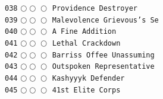 \documentclass[a4paper,landscape]{article}
\begin{document}
\begin{multicols*}{5}
\texttt{038} \(\bigcirc\!\bigcirc\!\bigcirc\)  \texttt{Providence Destroyer} \vspace{-0.3mm}\\ 
\texttt{039} \(\bigcirc\!\bigcirc\!\bigcirc\)  \texttt{Malevolence Grievous's Se} \vspace{-0.3mm}\\ 
\texttt{040} \(\bigcirc\!\bigcirc\!\bigcirc\)  \texttt{A Fine Addition} \vspace{-0.3mm}\\ 
\texttt{041} \(\bigcirc\!\bigcirc\!\bigcirc\)  \texttt{Lethal Crackdown} \vspace{-0.3mm}\\ 
\texttt{042} \(\bigcirc\!\bigcirc\!\bigcirc\)  \texttt{Barriss Offee Unassuming } \vspace{-0.3mm}\\ 
\texttt{043} \(\bigcirc\!\bigcirc\!\bigcirc\)  \texttt{Outspoken Representative} \vspace{-0.3mm}\\ 
\texttt{044} \(\bigcirc\!\bigcirc\!\bigcirc\)  \texttt{Kashyyyk Defender} \vspace{-0.3mm}\\ 
\texttt{045} \(\bigcirc\!\bigcirc\!\bigcirc\)  \texttt{41st Elite Corps} \vspace{-0.3mm}\\ 

\end{multicols*}
\end{document}
